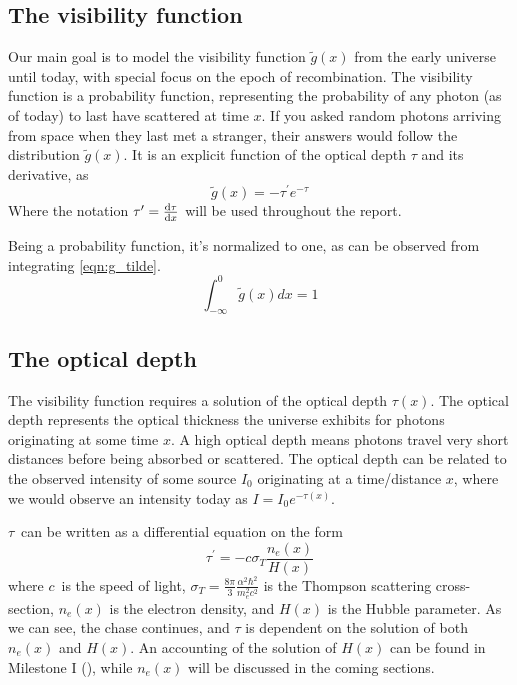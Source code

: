 \documentclass[10pt, a4paper]{article}
\renewcommand{\exp}{e^}
\renewcommand{\exp}{e^}
\begin{document}
\subsection{The visibility function}
Our main goal is to model the visibility function $\tilde{g}(x)$ from the early universe until today, with special focus on the epoch of recombination. The visibility function is a probability function, representing the probability of any photon (as of today) to last have scattered at time $x$. If you asked random photons arriving from space when they last met a stranger, their answers would follow the distribution $\tilde{g}(x)$. It is an explicit function of the optical depth $\tau$ and its derivative, as
\begin{equation}\label{eqn:g_tilde}
    \tilde{g}(x) = -\tau^{\prime} e^{-\tau}
\end{equation}
Where the notation $\tau^\prime = \dv{\tau}{x}$ will be used throughout the report.

Being a probability function, it's normalized to one, as can be observed from integrating \ref{eqn:g_tilde}.
\begin{equation}
    \int_{-\infty}^{0} \tilde{g}(x) d x = 1
\end{equation}


\subsection{The optical depth}
The visibility function requires a solution of the optical depth $\tau(x)$. The optical depth represents the optical thickness the universe exhibits for photons originating at some time $x$. A high optical depth means photons travel very short distances before being absorbed or scattered. The optical depth can be related to the observed intensity of some source $I_0$ originating at a time/distance $x$, where we would observe an intensity today as $I = I_0\exp{-\tau(x)}$.

$\tau$ can be written as a differential equation on the form
\begin{equation}\label{eqn:tau_ODE}
    \tau^\prime = - c \sigma_T\frac{n_{e}(x)}{H(x)}
\end{equation}
where $c$ is the speed of light, $\sigma_T = \frac{8 \pi}{3} \frac{\alpha^{2} \hbar^{2}}{m_{e}^{2} c^{2}}$ is the Thompson scattering cross-section, $n_e(x)$ is the electron density, and $H(x)$ is the Hubble parameter. As we can see, the chase continues, and $\tau$ is dependent on the solution of both $n_e(x)$ and $H(x)$. An accounting of the solution of $H(x)$ can be found in Milestone I (\cite{Milestone1}), while $n_e(x)$ will be discussed in the coming sections.
\end{document}
